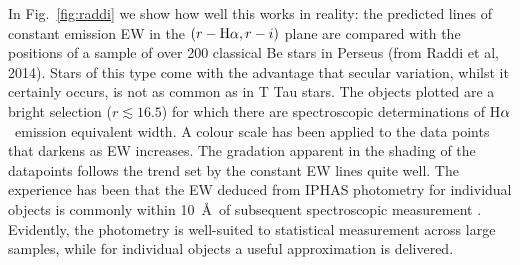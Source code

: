 \documentclass[a4paper,useAMS,usenatbib]{mn2e}
\def\ha{\mbox{H$\rm \alpha$}}
\begin{document}
{In Fig.~\ref{fig:raddi} we show how well this works in reality:
the predicted lines of constant emission EW
in the $(r - \ha, r - i)$ plane
are compared with the positions of a sample
of over 200 classical Be stars in Perseus (from Raddi et al, 2014).
Stars of this type come with the advantage that secular variation,
whilst it certainly occurs,
is not as common as in T Tau stars.
The objects plotted are a bright selection ($r \lesssim 16.5$)
for which there are spectroscopic determinations
of \ha\ emission equivalent width.
A colour scale has been applied to the data points
that darkens as EW increases.
The gradation apparent in the shading of the datapoints
follows the trend set by the constant EW lines quite well.  
The experience has been that the EW deduced from
IPHAS photometry for individual objects is commonly within 10~\AA\
of subsequent spectroscopic measurement
\citep[see also fig.~5 of][]{Barentsen2011a}.
Evidently, the photometry is well-suited to statistical measurement
across large samples, while for individual objects a useful
approximation is delivered.

}
\end{document}
